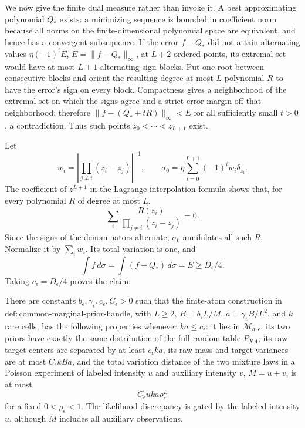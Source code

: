 We now give the finite dual measure rather than invoke it.  A best approximating polynomial \(Q_*\) exists: a minimizing sequence is bounded in coefficient norm because all norms on the finite-dimensional polynomial space are equivalent, and hence has a convergent subsequence.  If the error \(f-Q_*\) did not attain alternating values \(\eta(-1)^iE\), \(E=\|f-Q_*\|_\infty\), at \(L+2\) ordered points, its extremal set would have at most \(L+1\) alternating sign blocks.  Put one root between consecutive blocks and orient the resulting degree-at-most-\(L\) polynomial \(R\) to have the error's sign on every block.  Compactness gives a neighborhood of the extremal set on which the signs agree and a strict error margin off that neighborhood; therefore \(\|f-(Q_*+tR)\|_\infty<E\) for all sufficiently small \(t>0\), a contradiction.  Thus such points \(z_0<\cdots<z_{L+1}\) exist.

Let
\[
 w_i=\left|\prod_{j\ne i}(z_i-z_j)\right|^{-1},\qquad
 \sigma_0=\eta\sum_{i=0}^{L+1}(-1)^iw_i\delta_{z_i}.
\]
The coefficient of \(z^{L+1}\) in the Lagrange interpolation formula shows that, for every polynomial \(R\) of degree at most \(L\),
\[
 \sum_i\frac{R(z_i)}{\prod_{j\ne i}(z_i-z_j)}=0.
\]
Since the signs of the denominators alternate, \(\sigma_0\) annihilates all such \(R\).  Normalize it by \(\sum_iw_i\).  Its total variation is one, and
\[
 \int f\,d\sigma=\int(f-Q_*)\,d\sigma=E\ge D_\epsilon/4.
\]
Taking \(c_\epsilon=D_\epsilon/4\) proves the claim.

There are constants \(b_\epsilon,\gamma_\epsilon,c_\epsilon,C_\epsilon>0\) such that the finite-atom construction in \(\mathrm{def:common\mbox{-}marginal\mbox{-}prior\mbox{-}handle}\), with \(L\ge2\), \(B=b_\epsilon L/M\), \(a=\gamma_\epsilon B/L^2\), and \(k\) rare cells, has the following properties whenever \(ka\le c_\epsilon\): it lies in \(\mathcal M_{d,\epsilon}\), its two priors have exactly the same distribution of the full random table \(P_{XA}\), its raw target centers are separated by at least \(c_\epsilon ka\), its raw mass and target variances are at most \(C_\epsilon kBa\), and the total variation distance of the two mixture laws in a Poisson experiment of labeled intensity \(u\) and auxiliary intensity \(v\), \(M=u+v\), is at most
\[
 C_\epsilon uka\rho_\epsilon^L
\]
for a fixed \(0<\rho_\epsilon<1\).  The likelihood discrepancy is gated by the labeled intensity \(u\), although \(M\) includes all auxiliary observations.


